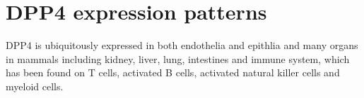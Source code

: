\section{DPP4 expression patterns}
DPP4 is ubiquitously expressed in both endothelia and epithlia and  many organs in mammals including kidney, liver, lung, intestines and immune system, which has been found on T cells, activated B cells, activated natural killer cells and myeloid cells.~\cite{Abbott1994,Shingu2003,Hong1989,Gutschmidt1981,Dikov2004,Bühling1995,Tanaka1992,Gorrell1991}